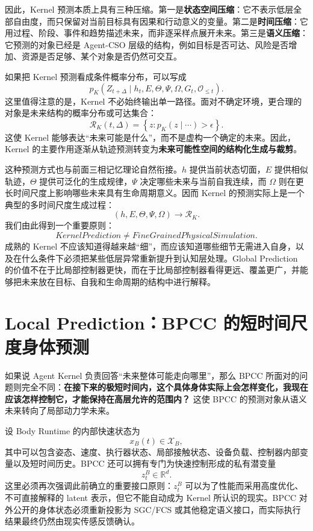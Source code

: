 因此，Kernel 预测本质上具有三种压缩。第一是\textbf{状态空间压缩}：它不表示低层全部自由度，而只保留对当前目标具有因果和行动意义的变量。第二是\textbf{时间压缩}：它用过程、阶段、事件和趋势描述未来，而非逐采样点展开未来。第三是\textbf{语义压缩}：它预测的对象已经是 Agent-CSO 层级的结构，例如目标是否可达、风险是否增加、资源是否足够、某个对象是否仍然可交互。

如果把 Kernel 预测看成条件概率分布，可以写成
\[
p_K
\left(
Z_{t+\Delta}
\mid
h_t,E,\Theta,\Psi,\Omega,G_t,\mathcal O_{\leq t}
\right).
\]
这里值得注意的是，Kernel 不必始终输出单一路径。面对不确定环境，更合理的对象是未来结构的概率分布或可达集合：
\[
\mathcal R_K(t,\Delta)
=
\left\{
z:
p_K(z\mid\cdots)>\epsilon
\right\}.
\]
这使 Kernel 能够表达“未来可能是什么”，而不是虚构一个确定的未来。因此，Kernel 的主要作用逐渐从轨迹预测转变为\textbf{未来可能性空间的结构化生成与裁剪}。

这种预测方式也与前面三相记忆理论自然衔接。$h$ 提供当前状态切面，$E$ 提供相似轨迹，$\Theta$ 提供可泛化的生成规律，$\Psi$ 决定哪些未来与当前自我连续，而 $\Omega$ 则在更长时间尺度上影响哪些未来具有生命周期意义。因而 Kernel 的预测实际上是一个典型的多时间尺度生成过程：
\[
(h,E,\Theta,\Psi,\Omega)
\longrightarrow
\mathcal R_K.
\]
我们由此得到一个重要原则：
\[
\boxed{
KernelPrediction\neq FineGrainedPhysicalSimulation.
}
\]
成熟的 Kernel 不应该知道得越来越“细”，而应该知道哪些细节无需进入自身，以及在什么条件下必须把某些低层异常重新提升到认知层处理。Global Prediction 的价值不在于比局部控制器更快，而在于比局部控制器看得更远、覆盖更广，并能够把未来放在目标、自我和生命周期的结构中进行解释。

\section{Local Prediction：BPCC 的短时间尺度身体预测}

如果说 Agent Kernel 负责回答“未来整体可能走向哪里”，那么 BPCC 所面对的问题则完全不同：\textbf{在接下来的极短时间内，这个具体身体实际上会怎样变化，我现在应该怎样控制它，才能保持在高层允许的范围内？} 这使 BPCC 的预测对象从语义未来转向了局部动力学未来。

设 Body Runtime 的内部快速状态为
\[
x_B(t)\in\mathcal X_B,
\]
其中可以包含姿态、速度、执行器状态、局部接触状态、设备负载、控制器内部变量以及短时间历史。BPCC 还可以拥有专门为快速控制形成的私有潜变量
\[
z_t^{B}\in\mathbb R^d.
\]
这里必须再次强调此前确立的重要接口原则：$z_t^{B}$ 可以为了性能而采用高度优化、不可直接解释的 latent 表示，但它不能自动成为 Kernel 所认识的现实。BPCC 对外公开的身体状态必须重新投影为 SGC/FCS 或其他稳定语义接口，而实际执行结果最终仍然由现实传感反馈确认。

